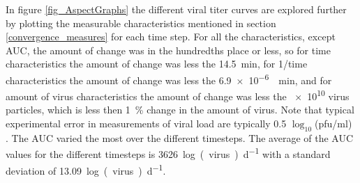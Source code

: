 In figure \ref{fig_AspectGraphs} the different viral titer curves are explored further by plotting the measurable characteristics mentioned in section \ref{convergence_measures} for each time step. For all the characteristics, except AUC, the amount of change was in the hundredths place or less, so for time characteristics the amount of change was less the \SI{14.5}{\minute}, for 1/time characteristics the amount of change was less the \SI{6.9e-6}{\per\minute}, and for amount of virus characteristics the amount of change was less the \num{e10} virus particles, which is less then \SI{1}{\percent} change in the amount of virus. Note that typical experimental error in measurements of viral load are typically 0.5 $\log_{10}$(pfu/ml) \cite{labarre01}. The AUC varied the most over the different timesteps. The average of the AUC values for the different timesteps is \SI{3626}{log(virus)\per\day} with a standard deviation of \SI{13.09}{log(virus)\per\day}. 

